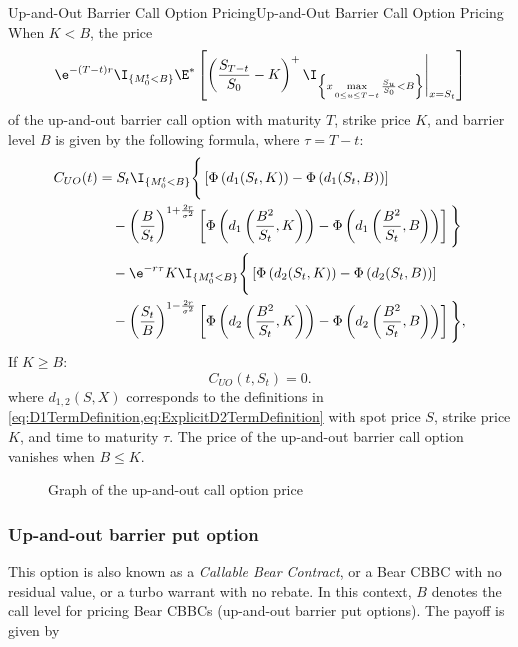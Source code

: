 \begin{prop}{Up-and-Out Barrier Call Option Pricing}{Up-and-Out Barrier Call Option Pricing}
	When $K < B$, the price
	\begin{equation}
		\e^{-(T-t)r} \I_{\{M_0^t < B\}} \E^* \left[ \left( \frac{S_{T-t}}{S_0} - K \right)^+ \I_{\left\{ x \max\limits_{0 \le u \le T-t} \frac{S_u}{S_0} < B \right\}} \Bigg|_{x=S_t} \right]
	\end{equation}
	of the up-and-out barrier call option with maturity $T$, strike price $K$, and barrier level $B$ is given by the following formula, where $\tau = T-t$:
	\begin{align}
		C_{UO}(t) & = S_t \I_{\{M_0^t < B\}} \Bigg\{ \left[ \Phi \left( d_1(S_t, K) \right) - \Phi \left( d_1(S_t, B) \right) \right] \nonumber                                                                                   \\
		          & \quad - \left( \frac{B}{S_t} \right)^{1+\frac{2r}{\sigma^2}} \left[ \Phi \left( d_1\left(\frac{B^2}{S_t}, K\right) \right) - \Phi \left( d_1\left(\frac{B^2}{S_t}, B\right) \right) \right] \Bigg\} \nonumber \\
		          & \quad - \e^{-r\tau} K \I_{\{M_0^t < B\}} \Bigg\{ \left[ \Phi \left( d_2(S_t, K) \right) - \Phi \left( d_2(S_t, B) \right) \right] \nonumber                                                                   \\
		          & \quad - \left( \frac{S_t}{B} \right)^{1-\frac{2r}{\sigma^2}} \left[ \Phi \left( d_2\left(\frac{B^2}{S_t}, K\right) \right) - \Phi \left( d_2\left(\frac{B^2}{S_t}, B\right) \right) \right] \Bigg\},
	\end{align}
	If $K \ge B$:
	\begin{equation}
		C_{UO}(t, S_t) = 0.
	\end{equation}
	where $d_{1,2}(S, X)$ corresponds to the definitions in \cref{eq:D1TermDefinition,eq:ExplicitD2TermDefinition} with spot price $S$, strike price $K$, and time to maturity $\tau$. The price of the up-and-out barrier call option vanishes when $B \le K$.
\end{prop}

\begin{figure}[H]
	\centering
	
	\caption{Graph of the up-and-out call option price}
	\label{fig:upAndOutCallBarrierSurface}
\end{figure}

\clearpage
\subsubsection{Up-and-out barrier put option}
This option is also known as a \textit{Callable Bear Contract}, or a Bear CBBC with no residual value, or a turbo warrant with no rebate. In this context, $B$ denotes the call level for pricing Bear CBBCs (up-and-out barrier put options). The payoff is given by

